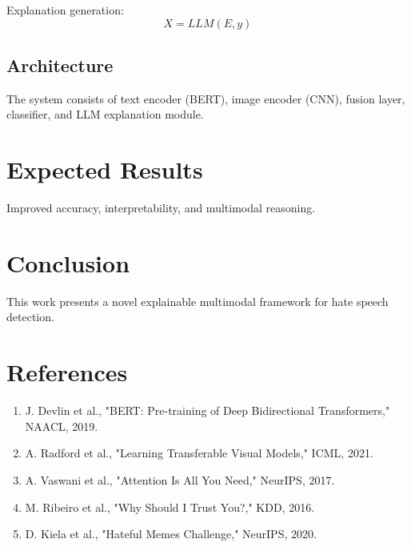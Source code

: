 \documentclass[conference]{IEEEtran}
\begin{document}
Explanation generation:
\begin{equation}
X = LLM(E, y)
\end{equation}

\subsection{Architecture}
The system consists of text encoder (BERT), image encoder (CNN), fusion layer, classifier, and LLM explanation module.

\section{Expected Results}
Improved accuracy, interpretability, and multimodal reasoning.

\section{Conclusion}
This work presents a novel explainable multimodal framework for hate speech detection.

\section*{References}
\begin{enumerate}
\item J. Devlin et al., "BERT: Pre-training of Deep Bidirectional Transformers," NAACL, 2019.
\item A. Radford et al., "Learning Transferable Visual Models," ICML, 2021.
\item A. Vaswani et al., "Attention Is All You Need," NeurIPS, 2017.
\item M. Ribeiro et al., "Why Should I Trust You?," KDD, 2016.
\item D. Kiela et al., "Hateful Memes Challenge," NeurIPS, 2020.
\end{enumerate}
\end{document}
